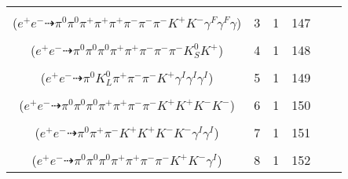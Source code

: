 \documentclass[landscape]{article}
\newcounter{rownumbers}
\newcommand\rn{\stepcounter{rownumbers}\arabic{rownumbers}}
\newcommand{\EOL}{\\} %
\newcommand{\topoTags}[1]{#1} %
\begin{document}
\begin{longtable}{clcccc}
\rn & \makecell[l]{ $ 
e^{+} e^{-} \rightarrow \rho^{0} \pi^{+} \pi^{-} \pi^{-} \rho^{+} \omega K^{+} K^{-} ,
\rho^{0} \rightarrow \pi^{+} \pi^{-} \gamma^{F} ,
\rho^{+} \rightarrow \pi^{0} \pi^{+} \gamma^{F} ,
\omega \rightarrow \pi^{0} \gamma 
$ \\ ($
e^{+} e^{-} \dashrightarrow \pi^{0} \pi^{0} \pi^{+} \pi^{+} \pi^{+} \pi^{-} \pi^{-} \pi^{-} K^{+} K^{-} \gamma^{F} \gamma^{F} \gamma 
$) } & \topoTags{3 & }1 & 147 \EOL

\rn & \makecell[l]{ $ 
e^{+} e^{-} \rightarrow \pi^{0} \pi^{0} \pi^{+} \pi^{-} \pi^{-} \rho^{+} \bar{K}^{0} K^{*} ,
\rho^{+} \rightarrow \pi^{0} \pi^{+} ,
\bar{K}^{0} \rightarrow K_{S}^{0} ,
K^{*} \rightarrow \pi^{-} K^{+} 
$ \\ ($
e^{+} e^{-} \dashrightarrow \pi^{0} \pi^{0} \pi^{0} \pi^{+} \pi^{+} \pi^{-} \pi^{-} \pi^{-} K_{S}^{0} K^{+} 
$) } & \topoTags{4 & }1 & 148 \EOL

\rn & \makecell[l]{ $ 
e^{+} e^{-} \rightarrow \pi^{0} \pi^{+} \pi^{-} \bar{K}^{0} K^{*} \gamma^{I} \gamma^{I} \gamma^{I} ,
\bar{K}^{0} \rightarrow K_{L}^{0} ,
K^{*} \rightarrow \pi^{-} K^{+} 
$ \\ ($
e^{+} e^{-} \dashrightarrow \pi^{0} K_{L}^{0} \pi^{+} \pi^{-} \pi^{-} K^{+} \gamma^{I} \gamma^{I} \gamma^{I} 
$) } & \topoTags{5 & }1 & 149 \EOL

\rn & \makecell[l]{ $ 
e^{+} e^{-} \rightarrow \pi^{0} \pi^{+} \pi^{+} \pi^{-} \rho^{-} K^{+} K^{*-} \phi ,
\rho^{-} \rightarrow \pi^{0} \pi^{-} ,
K^{*-} \rightarrow \pi^{0} K^{-} ,
\phi \rightarrow K^{+} K^{-} 
$ \\ ($
e^{+} e^{-} \dashrightarrow \pi^{0} \pi^{0} \pi^{0} \pi^{+} \pi^{+} \pi^{-} \pi^{-} K^{+} K^{+} K^{-} K^{-} 
$) } & \topoTags{6 & }1 & 150 \EOL

\rn & \makecell[l]{ $ 
e^{+} e^{-} \rightarrow \rho^{-} \bar{K}^{*} K^{+} K^{+} K^{-} \gamma^{I} \gamma^{I} ,
\rho^{-} \rightarrow \pi^{0} \pi^{-} ,
\bar{K}^{*} \rightarrow \pi^{+} K^{-} 
$ \\ ($
e^{+} e^{-} \dashrightarrow \pi^{0} \pi^{+} \pi^{-} K^{+} K^{+} K^{-} K^{-} \gamma^{I} \gamma^{I} 
$) } & \topoTags{7 & }1 & 151 \EOL

\rn & \makecell[l]{ $ 
e^{+} e^{-} \rightarrow \pi^{0} \pi^{-} \rho^{+} \rho^{-} \bar{K}^{*} K^{+} \gamma^{I} ,
\rho^{+} \rightarrow \pi^{0} \pi^{+} ,
\rho^{-} \rightarrow \pi^{0} \pi^{-} ,
\bar{K}^{*} \rightarrow \pi^{+} K^{-} 
$ \\ ($
e^{+} e^{-} \dashrightarrow \pi^{0} \pi^{0} \pi^{0} \pi^{+} \pi^{+} \pi^{-} \pi^{-} K^{+} K^{-} \gamma^{I} 
$) } & \topoTags{8 & }1 & 152 \EOL


\end{longtable}
\end{document}
